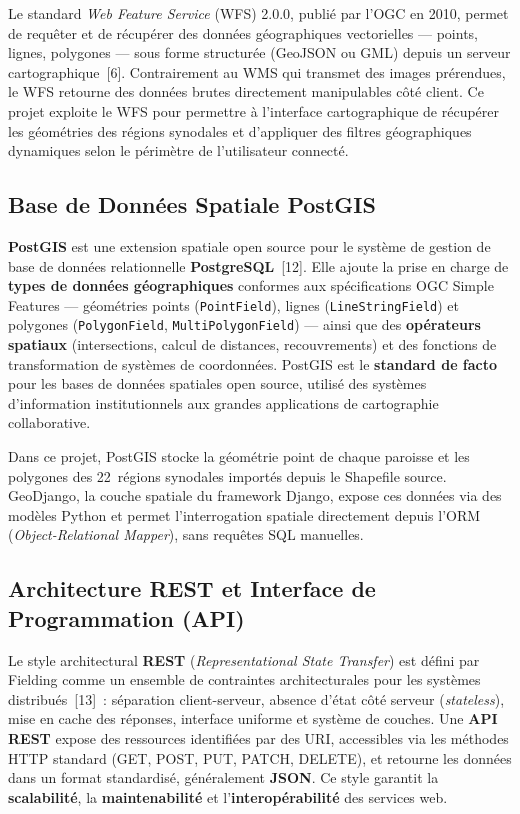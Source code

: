 \documentclass[12pt, a4paper]{report}
\newcommand{\kw}[1]{\textbf{#1}}
\begin{document}
Le standard \textit{Web Feature Service} (WFS) 2.0.0, publié par l'OGC en 2010,
permet de requêter et de récupérer des données géographiques vectorielles ---
points, lignes, polygones --- sous forme structurée (GeoJSON ou GML) depuis un
serveur cartographique~[6]. Contrairement au WMS qui transmet des
images prérendues, le WFS retourne des données brutes directement manipulables
côté client. Ce projet exploite le WFS pour permettre à l'interface cartographique
de récupérer les géométries des régions synodales et d'appliquer des filtres
géographiques dynamiques selon le périmètre de l'utilisateur connecté.

\subsection{Base de Données Spatiale PostGIS}

\kw{PostGIS} est une extension spatiale open source pour le système de gestion de
base de données relationnelle \kw{PostgreSQL}~[12]. Elle ajoute la
prise en charge de \textbf{types de données géographiques} conformes aux
spécifications OGC Simple Features --- géométries points (\texttt{PointField}),
lignes (\texttt{LineStringField}) et polygones (\texttt{PolygonField},
\texttt{MultiPolygonField}) --- ainsi que des \textbf{opérateurs spatiaux}
(intersections, calcul de distances, recouvrements) et des fonctions de
transformation de systèmes de coordonnées. PostGIS est le \textbf{standard de
facto} pour les bases de données spatiales open source, utilisé des systèmes
d'information institutionnels aux grandes applications de cartographie
collaborative.

Dans ce projet, PostGIS stocke la géométrie point de chaque paroisse et les
polygones des 22~régions synodales importés depuis le Shapefile source.
GeoDjango, la couche spatiale du framework Django, expose ces données via des
modèles Python et permet l'interrogation spatiale directement depuis l'ORM
(\textit{Object-Relational Mapper}), sans requêtes SQL manuelles.

\subsection{Architecture REST et Interface de Programmation (API)}

Le style architectural \kw{REST} (\textit{Representational State Transfer}) est
défini par Fielding comme un ensemble de contraintes architecturales pour les
systèmes distribués~[13]~: séparation client-serveur, absence
d'état côté serveur (\textit{stateless}), mise en cache des réponses, interface
uniforme et système de couches. Une \kw{API REST} expose des ressources
identifiées par des URI, accessibles via les méthodes HTTP standard
(GET, POST, PUT, PATCH, DELETE), et retourne les données dans un format
standardisé, généralement \textbf{JSON}. Ce style garantit la \textbf{scalabilité},
la \textbf{maintenabilité} et l'\textbf{interopérabilité} des services web.
\end{document}
